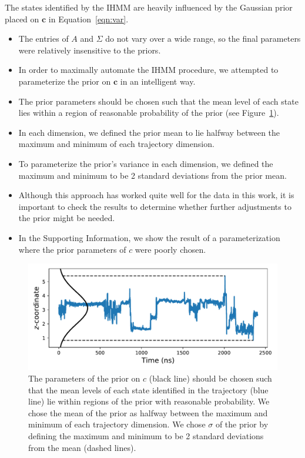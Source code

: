\documentclass{article}
\begin{document}
  The states identified by the IHMM are heavily influenced by the Gaussian prior
  placed on $\mathbf{c}$ in Equation~\ref{eqn:var}.
  \begin{itemize}
    \item The entries of $A$ and $\Sigma$ do not vary over a wide range, so
    the final parameters were relatively insensitive to the priors.
    \item In order to maximally automate the IHMM procedure, we attempted to
    parameterize the prior on $\mathbf{c}$ in an intelligent way.
    \item The prior parameters should be chosen such that the mean level of 
    each state lies within a region of reasonable probability of the prior (see
    Figure~\ref{fig:prior_guesses}).
    \item In each dimension, we defined the prior mean to lie halfway between the 
    maximum and minimum of each trajectory dimension. 
    \item To parameterize the prior's variance in each dimension, we defined the
    maximum and minimum to be 2 standard deviations from the prior mean.
    \item Although this approach has worked quite well for the data in this work,
    it is important to check the results to determine whether further adjustments
    to the prior might be needed.
    \item In the Supporting Information, we show the result of a parameterization
    where the prior parameters of $c$ were poorly chosen. %
  \end{itemize}
  
  \begin{figure}
  \centering
  \includegraphics[width=\textwidth]{prior_guesses.pdf}
  \caption{The parameters of the prior on $c$ (black line) should be chosen such
  that the mean levels of each state identified in the trajectory (blue line) lie within
  regions of the prior with reasonable probability. We chose the mean of the prior 
  as halfway between the maximum and minimum of each trajectory dimension. We chose 
  $\sigma$ of the prior by defining the maximum and minimum to be 2 standard deviations
  from the mean (dashed lines).}\label{fig:prior_guesses}
  \end{figure}
  
\end{document}
